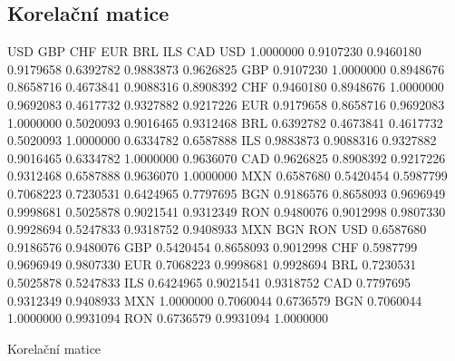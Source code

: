 \documentclass[a4paper]{ article}
\begin{document}
\subsection{Korelační matice}
\begin{table}[H]
\begin{Schunk}
\begin{Soutput}
          USD       GBP       CHF       EUR       BRL       ILS       CAD
USD 1.0000000 0.9107230 0.9460180 0.9179658 0.6392782 0.9883873 0.9626825
GBP 0.9107230 1.0000000 0.8948676 0.8658716 0.4673841 0.9088316 0.8908392
CHF 0.9460180 0.8948676 1.0000000 0.9692083 0.4617732 0.9327882 0.9217226
EUR 0.9179658 0.8658716 0.9692083 1.0000000 0.5020093 0.9016465 0.9312468
BRL 0.6392782 0.4673841 0.4617732 0.5020093 1.0000000 0.6334782 0.6587888
ILS 0.9883873 0.9088316 0.9327882 0.9016465 0.6334782 1.0000000 0.9636070
CAD 0.9626825 0.8908392 0.9217226 0.9312468 0.6587888 0.9636070 1.0000000
MXN 0.6587680 0.5420454 0.5987799 0.7068223 0.7230531 0.6424965 0.7797695
BGN 0.9186576 0.8658093 0.9696949 0.9998681 0.5025878 0.9021541 0.9312349
RON 0.9480076 0.9012998 0.9807330 0.9928694 0.5247833 0.9318752 0.9408933
          MXN       BGN       RON
USD 0.6587680 0.9186576 0.9480076
GBP 0.5420454 0.8658093 0.9012998
CHF 0.5987799 0.9696949 0.9807330
EUR 0.7068223 0.9998681 0.9928694
BRL 0.7230531 0.5025878 0.5247833
ILS 0.6424965 0.9021541 0.9318752
CAD 0.7797695 0.9312349 0.9408933
MXN 1.0000000 0.7060044 0.6736579
BGN 0.7060044 1.0000000 0.9931094
RON 0.6736579 0.9931094 1.0000000
\end{Soutput}
\end{Schunk}
\caption{Korelační matice}
\end{table}
\end{document}
